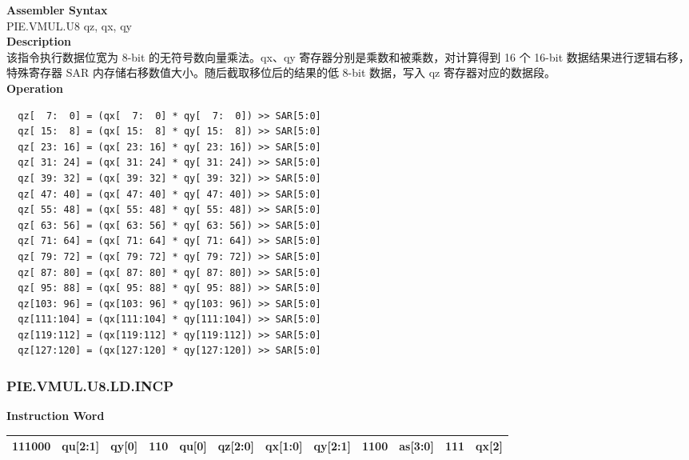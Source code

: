 \textbf{Assembler Syntax} \\
PIE.VMUL.U8 qz, qx, qy \\
\textbf{Description} \\
该指令执行数据位宽为 8-bit 的无符号数向量乘法。qx、qy 寄存器分别是乘数和被乘数，对计算得到 16 个 16-bit 数据结果进行逻辑右移，特殊寄存器 SAR 内存储右移数值大小。随后截取移位后的结果的低 8-bit 数据，写入 qz 寄存器对应的数据段。\\
\textbf{Operation}
\begin{lstlisting}
  qz[  7:  0] = (qx[  7:  0] * qy[  7:  0]) >> SAR[5:0]
  qz[ 15:  8] = (qx[ 15:  8] * qy[ 15:  8]) >> SAR[5:0]
  qz[ 23: 16] = (qx[ 23: 16] * qy[ 23: 16]) >> SAR[5:0]
  qz[ 31: 24] = (qx[ 31: 24] * qy[ 31: 24]) >> SAR[5:0]
  qz[ 39: 32] = (qx[ 39: 32] * qy[ 39: 32]) >> SAR[5:0]
  qz[ 47: 40] = (qx[ 47: 40] * qy[ 47: 40]) >> SAR[5:0]
  qz[ 55: 48] = (qx[ 55: 48] * qy[ 55: 48]) >> SAR[5:0]
  qz[ 63: 56] = (qx[ 63: 56] * qy[ 63: 56]) >> SAR[5:0]
  qz[ 71: 64] = (qx[ 71: 64] * qy[ 71: 64]) >> SAR[5:0]
  qz[ 79: 72] = (qx[ 79: 72] * qy[ 79: 72]) >> SAR[5:0]
  qz[ 87: 80] = (qx[ 87: 80] * qy[ 87: 80]) >> SAR[5:0]
  qz[ 95: 88] = (qx[ 95: 88] * qy[ 95: 88]) >> SAR[5:0]
  qz[103: 96] = (qx[103: 96] * qy[103: 96]) >> SAR[5:0]
  qz[111:104] = (qx[111:104] * qy[111:104]) >> SAR[5:0]
  qz[119:112] = (qx[119:112] * qy[119:112]) >> SAR[5:0]
  qz[127:120] = (qx[127:120] * qy[127:120]) >> SAR[5:0]
\end{lstlisting}

\newpage
\subsubsection{PIE.VMUL.U8.LD.INCP}\label{instruction:PIEVMULU8LDINCP}
\setlength\tabcolsep{6pt}
\textbf{Instruction Word} \\
\begin{tabular}{|c|c|c|c|c|c|c|c|c|c|c|c|}
	\hline
	111000 & qu[2:1] & qy[0] & 110 & qu[0] & qz[2:0] & qx[1:0] & qy[2:1] & 1100 & as[3:0] & 111 & qx[2] \\
	\hline
\end{tabular}

